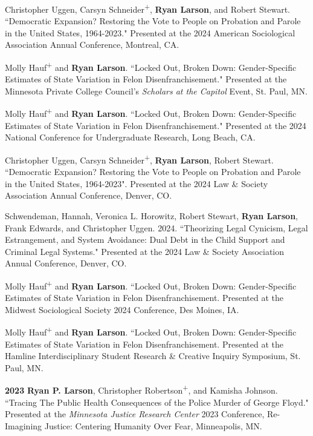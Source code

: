 \documentclass[letterpaper]{article}
\newenvironment{publist}{%
  \begin{list}{}{%
    \setlength{\leftmargin}{0cm}   %
    \setlength{\labelwidth}{2cm}     %
    \setlength{\labelsep}{0.5cm}     %
  }%
}{%
  \end{list}%
}
\begin{document}
\begin{publist}
\item Christopher Uggen, Carsyn Schneider\textsuperscript{+}, \textbf{Ryan Larson}, and Robert Stewart. ``Democratic Expansion? Restoring the Vote to People on Probation and Parole in the United States, 1964-2023." Presented at the 2024 American Sociological Association Annual Conference, Montreal, CA. 

\item Molly Hauf\textsuperscript{+} and \textbf{Ryan Larson}. ``Locked Out, Broken Down: Gender-Specific Estimates of State Variation in Felon Disenfranchisement." Presented at the Minnesota Private College Council's \textit{Scholars at the Capitol} Event, St. Paul, MN. 

\item Molly Hauf\textsuperscript{+} and \textbf{Ryan Larson}. ``Locked Out, Broken Down: Gender-Specific Estimates of State Variation in Felon Disenfranchisement." Presented at the 2024 National Conference for Undergraduate Research, Long Beach, CA. 

\item Christopher Uggen, Carsyn Schneider\textsuperscript{+}, \textbf{Ryan Larson}, Robert Stewart. ``Democratic Expansion? Restoring the Vote to People on Probation and Parole in the United States, 1964-2023". Presented at the 2024 Law \& Society Association Annual Conference, Denver, CO. 

\item Schwendeman, Hannah, Veronica L. Horowitz, Robert Stewart, \textbf{Ryan Larson}, Frank Edwards, and Christopher Uggen. 2024.  ``Theorizing Legal Cynicism, Legal Estrangement, and System Avoidance: Dual Debt in the Child Support and Criminal Legal Systems." Presented at the 2024 Law \& Society Association Annual Conference, Denver, CO. 

\item Molly Hauf\textsuperscript{+} and \textbf{Ryan Larson}. ``Locked Out, Broken Down: Gender-Specific Estimates of State Variation in Felon Disenfranchisement. Presented at the Midwest Sociological Society 2024 Conference, Des Moines, IA. 

\item Molly Hauf\textsuperscript{+} and \textbf{Ryan Larson}. ``Locked Out, Broken Down: Gender-Specific Estimates of State Variation in Felon Disenfranchisement. Presented at the Hamline Interdisciplinary Student Research \& Creative Inquiry Symposium, St. Paul, MN. 

\item[\textbf{2023}] \textbf{Ryan P. Larson}, Christopher Robertson\textsuperscript{+}, and Kamisha Johnson. ``Tracing The Public Health Consequences of the Police Murder of George Floyd." Presented at the \textit{Minnesota Justice Research Center} 2023 Conference, Re-Imagining Justice: Centering Humanity Over Fear, Minneapolis, MN.   


\end{publist}
\end{document}
